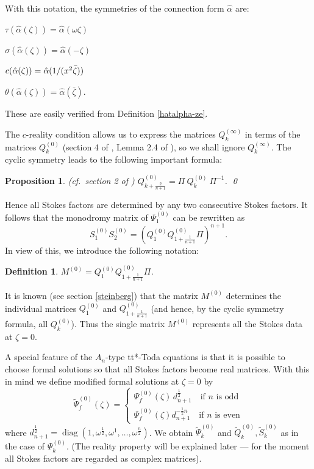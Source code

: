 \documentclass[a4paper,12pt,leqno]{amsart}
\numberwithin{equation}{section}
\theoremstyle{plain}
\newtheorem{proposition}[theorem]{Proposition}
\newtheorem{definition}[theorem]{Definition}
\theoremstyle{definition}
\newcommand{\al}{\alpha}
\renewcommand{\th}{\theta}
\newcommand{\om}{\omega}
\newcommand{\ze}{\zeta}
\DeclareMathOperator{\diag}{diag}
\newcommand{\no}{\noindent}
\newcommand{\Psiz}{  \Psi^{(0)}  }
\newcommand{\Sz}{  S^{(0)}  }
\newcommand{\Qz}{  Q^{(0)}  }
\newcommand{\Qi}{  Q^{(\infty)}  }
\newcommand{\Mz}{ M^{(0)}  }
\newcommand{\tPsiz}{  \tilde\Psi^{(0)}  }
\newcommand{\tSz}{  \tilde S^{(0)}  }
\newcommand{\tQz}{  \tilde Q^{(0)}  }
\begin{document}
With this notation, the symmetries of the connection form $\hat\al$ are:

  $\tau(\hat\alpha(\zeta))=\hat\alpha(\om \zeta)$

  $\sigma(\hat\alpha(\zeta))=\hat\alpha(-\ze)$

  $c(\hat\alpha(\zeta))=\hat\alpha(1/(x^2\bar\ze\vphantom{\tfrac{a}{a}}))$

 $\th(\hat{\alpha}(\ze))=\hat{\alpha}(\bar{\ze})$.

\no These are easily verified from Definition \ref{hatalpha-ze}.

The $c$-reality condition allows us to express the matrices $\Qi_k$ in terms of the matrices $\Qz_k$ (section 4 of \cite{GILX}, Lemma 2.4 of \cite{GIL2}),
so we shall ignore $\Qi_k$.  The cyclic symmetry
leads to the following important formula:
\begin{proposition}\label{tauM}
(cf.\ section 2 of \cite{GIL2})
$\Qz_{k+\scriptstyle\frac2{n+1}} = \Pi\  \Qz_k \  \Pi^{-1}$.
\qed
\end{proposition}
Hence all Stokes factors are determined by any two consecutive
Stokes factors. It follows that
the monodromy matrix of $\Psiz_1$ can be rewritten as
\[
\Sz_1 \Sz_2 = (\Qz_1\Qz_{1+\scriptstyle\frac1{n+1}}\Pi)^{n+1}.
\]
In view of this, we introduce the following
notation:

\begin{definition}\label{matrixM}
$\Mz=\Qz_1\Qz_{1+\scriptstyle\frac1{n+1}}\Pi$.
\end{definition}

It is known (see section \ref{steinberg}) that the matrix $\Mz$ determines the individual matrices
$\Qz_1$ and $\Qz_{1+\scriptstyle\frac1{n+1}}$ (and hence, by the cyclic
symmetry formula, all $\Qz_k$). Thus the single matrix
$\Mz$ represents all the Stokes data at $\ze=0$.

A special feature of the
$A_n$-type tt*-Toda equations is that it is possible to
choose formal solutions so that all Stokes factors become
real matrices.
With this in mind
we define modified formal solutions at $\ze=0$ by
\[
\tPsiz_f(\zeta) =
\begin{cases}
\Psiz_f(\zeta)  \, d_{n+1}^{\frac12} \quad\text{if $n$ is odd}
\\
\Psiz_f(\ze) d_{n+1}^{-\frac12n} \quad\text{if $n$ is even}
\end{cases}
\]
where
$d_{n+1}^{\frac12}=\diag(1,\omega^{\frac12},\omega^{1},\dots,\omega^{\frac{n}2})$.
We obtain $\tPsiz_k$ and
$\tQz_k,\tSz_k$ as in the case of $\Psiz_k$.  (The reality property will be explained
later --- for the moment all Stokes factors are regarded as complex matrices).
\end{document}
